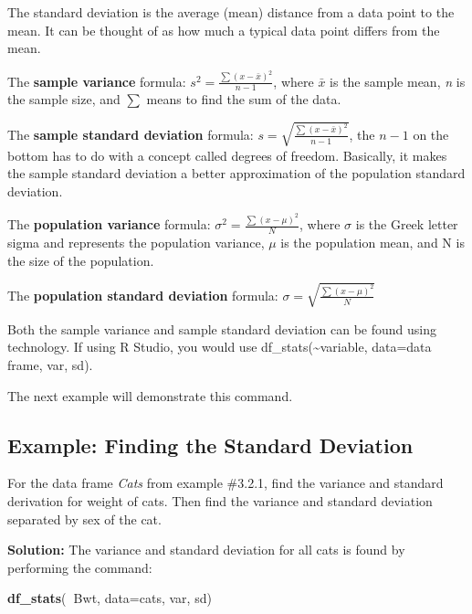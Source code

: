 \documentclass[]{book}
\newenvironment{Shaded}{\begin{snugshade}}{\end{snugshade}}
\newcommand{\DataTypeTok}[1]{\textcolor[rgb]{0.13,0.29,0.53}{#1}}
\newcommand{\KeywordTok}[1]{\textcolor[rgb]{0.13,0.29,0.53}{\textbf{#1}}}
\newcommand{\NormalTok}[1]{#1}
\newcommand{\OperatorTok}[1]{\textcolor[rgb]{0.81,0.36,0.00}{\textbf{#1}}}
\begin{document}
The standard deviation is the average (mean) distance from a data point
to the mean. It can be thought of as how much a typical data point
differs from the mean.

The \textbf{sample variance} formula:
\(s^2=\frac{\sum\left(x-\bar{x}\right)^2}{n-1}\), where \(\bar{x}\) is the sample mean, \emph{n} is the sample size, and \(\sum{}\) means to find the sum of the data.

The \textbf{sample standard deviation} formula:
\(s=\sqrt{ \frac{\sum\left(x-\bar{x}\right)^2}{n-1}}\), the \(n-1\) on the bottom has to do with a concept called degrees of freedom. Basically, it makes the sample standard deviation a better approximation of the population standard deviation.

The \textbf{population variance} formula:
\(\sigma^2 = \frac{\sum\left(x-\mu \right)^2}{N}\), where \(\sigma\) is the Greek letter sigma and represents the population variance,
\(\mu\) is the population mean, and N is the size of the population.

The \textbf{population standard deviation} formula:
\(\sigma =\sqrt{ \frac{\sum\left(x-\mu \right)^2}{N}}\)

Both the sample variance and sample standard deviation can be found using technology. If using R Studio, you would use df\_stats(\textasciitilde{}variable, data=data frame, var, sd).

The next example will demonstrate this command.

\hypertarget{example-finding-the-standard-deviation}{%
\subsection{Example: Finding the Standard Deviation}\label{example-finding-the-standard-deviation}}

For the data frame \emph{Cats} from example \#3.2.1, find the variance and standard derivation for weight of cats. Then find the variance and standard deviation separated by sex of the cat.

\textbf{Solution:}
The variance and standard deviation for all cats is found by performing the command:

\begin{Shaded}
\begin{Highlighting}[]
\KeywordTok{df_stats}\NormalTok{(}\OperatorTok{~}\NormalTok{Bwt, }\DataTypeTok{data=}\NormalTok{cats, var, sd)}
\end{Highlighting}
\end{Shaded}
\end{document}
